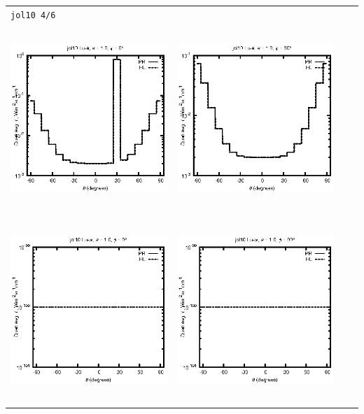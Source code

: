 \begin{tabular}{c c c c}
\multicolumn{4}{l}{\texttt{jol10 4/6}} \\
\includegraphics[height=7cm]{../eps/jol10_Lu_a_fwd.eps} &
\includegraphics[height=7cm]{../eps/jol10_Lu_a_cross.eps}\\
\includegraphics[height=7cm]{../eps/jol10_Lu_w_fwd.eps} &
\includegraphics[height=7cm]{../eps/jol10_Lu_w_cross.eps} \\

\end{tabular}
